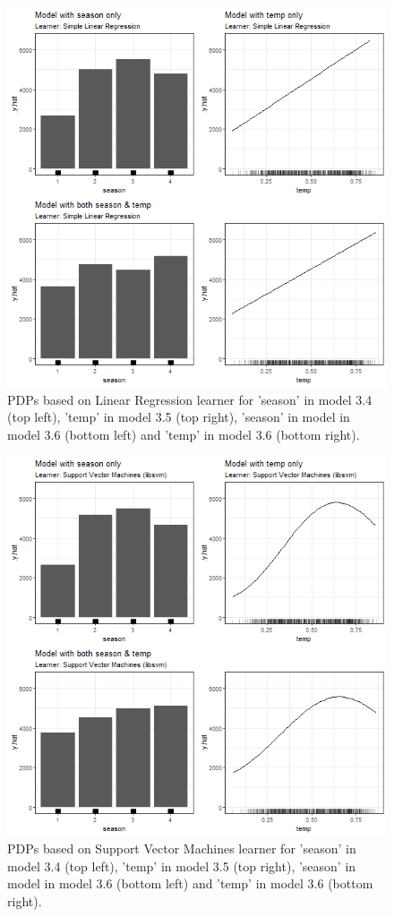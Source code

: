 \documentclass[
]{krantz}
\begin{document}
\begin{figure}

{\centering \includegraphics[width=0.8\linewidth]{images/VK_PDP_11_Correlated_cat_num_LM} 

}

\caption{PDPs based on Linear Regression learner for 'season' in model 3.4 (top left), 'temp' in model 3.5 (top right), 'season' in model in model 3.6 (bottom left) and 'temp' in model 3.6 (bottom right).}\label{fig:Figure11}
\end{figure}

\begin{figure}

{\centering \includegraphics[width=0.8\linewidth]{images/VK_PDP_12_Correlated_cat_num_SVM} 

}

\caption{PDPs based on Support Vector Machines learner for 'season' in model 3.4 (top left), 'temp' in model 3.5 (top right), 'season' in model in model 3.6 (bottom left) and 'temp' in model 3.6 (bottom right).}\label{fig:Figure12}
\end{figure}
\end{document}
